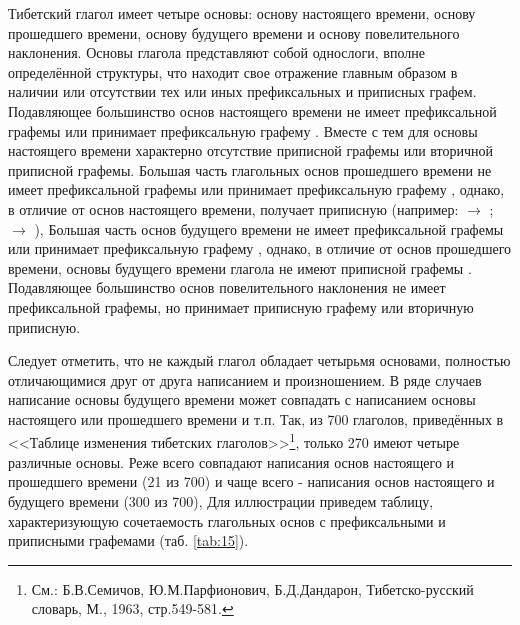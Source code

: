 Тибетский глагол имеет четыре основы: основу настоящего времени, основу прошедшего времени, основу будущего времени и основу повелительного наклонения. Основы глагола представляют собой однослоги, вполне определённой структуры, что находит свое отражение главным образом в наличии или отсутствии тех или иных префиксальных и приписных графем. Подавляющее большинство основ настоящего времени не имеет префиксальной графемы или принимает префиксальную графему . Вместе с тем для основы настоящего времени характерно отсутствие приписной графемы  или вторичной приписной графемы. Большая часть глагольных основ прошедшего времени не имеет префиксальной графемы или принимает префиксальную графему , однако, в отличие от основ настоящего времени, получает приписную  (например:  $\rightarrow$ ;  $\rightarrow$ ), Большая часть основ будущего времени не имеет префиксальной графемы или принимает префиксальную графему , однако, в отличие от основ прошедшего времени, основы будущего времени глагола не имеют приписной графемы . Подавляющее большинство основ повелительного наклонения не имеет префиксальной графемы, но принимает приписную графему  или вторичную приписную.

Следует отметить, что не каждый глагол обладает четырьмя основами, полностью отличающимися друг от друга написанием и произношением. В ряде случаев написание основы будущего времени может совпадать с написанием основы настоящего или прошедшего времени и т.п. Так, из 700 глаголов, приведённых в <<Таблице изменения тибетских
глаголов>>\footnote[33]{См.: Б.В.Семичов, Ю.М.Парфионович, Б.Д.Дандарон, Тибетско-русский словарь, М., 1963, стр.549-581.}, только 270 имеют четыре различные основы. Реже всего совпадают написания основ настоящего и прошедшего времени (21 из 700) и чаще всего - написания основ настоящего и будущего времени (300 из 700),
Для иллюстрации приведем таблицу, характеризующую сочетаемость глагольных основ с префиксальными и приписными графемами (таб. \ref{tab:15}).

